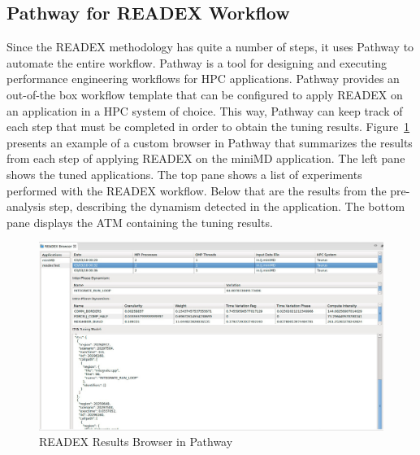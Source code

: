 \subsection{Pathway for READEX Workflow}
\label{sec:pathway_for_readex_workflow}

Since the READEX methodology has quite a number of steps, it uses Pathway to automate the entire workflow. Pathway \cite{Pathway:Petkov13} is a tool for designing and executing performance engineering workflows for HPC applications. Pathway provides an out-of-the box workflow template that can be configured to apply READEX on an application in a HPC system of choice. This way, Pathway can keep track of each step that must be completed in order to obtain the tuning results. Figure~\ref{fig:pathway_browser} presents an example of a custom browser in Pathway that summarizes the results from each step of applying READEX on the miniMD application. The left pane shows the tuned applications. The top pane shows a list of experiments performed with the READEX workflow. Below that are the results from the pre-analysis step, describing the dynamism detected in the application. The bottom pane displays the ATM containing the tuning results.


\begin{figure}[!t]
\centering
\includegraphics[width=.95\columnwidth]{figures/PathwayBrowser.jpeg}
\caption{READEX Results Browser in Pathway}
\label{fig:pathway_browser}
\end{figure}
